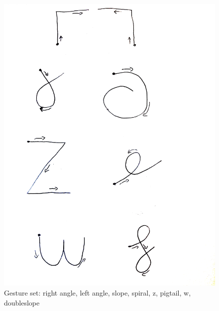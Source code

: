 \begin{center}
\begin{figure}
\includegraphics[scale=0.07]{images/gestureTemplate.jpg}
\caption{Gesture set: right angle, left angle, slope, spiral, z, pigtail, w, doubleslope}
\label{fig:gestureTemplate}
\end{figure}
\end{center}

